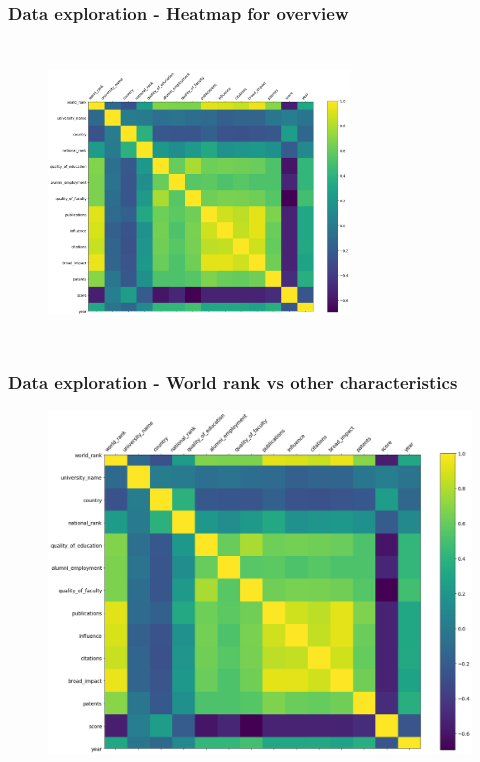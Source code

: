 \documentclass[mathserif,notheorems,11pt]{beamer}
\begin{document}
\begin{frame}
\frametitle{Data exploration - Heatmap for overview}
\begin{figure}[h]
	\centering
	\includegraphics[width=8cm,height=8cm,keepaspectratio]{graphs/world_uni_hm}

\end{figure}

\end{frame}

\begin{frame}
\frametitle{Data exploration - World rank vs  other characteristics}
\begin{figure}
	\centering
	\includegraphics[width=0.9\linewidth]{graphs/rank_scatterplot}
\end{figure}

\end{frame}
\end{document}

